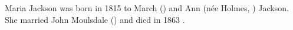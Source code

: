 
Maria Jackson was born in 1815 to March () and Ann (n\'{e}e Holmes, ) Jackson. She married John Moulsdale () and died in 1863 \cite{MariaJacksonDeath}.
